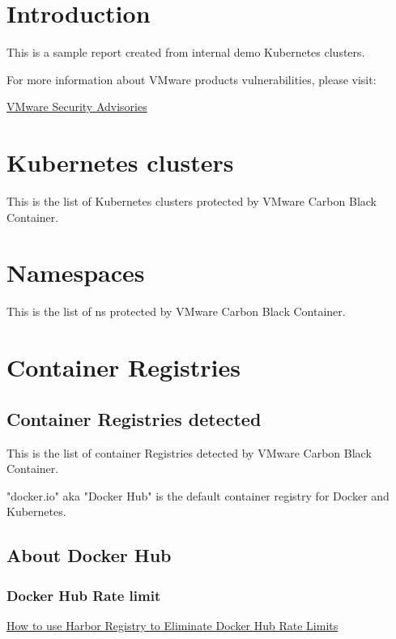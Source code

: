 \section{Introduction}

This is a sample report created from internal demo Kubernetes clusters.

\vskip15pt
\par

For more information about VMware products vulnerabilities, please visit:

\href{https://www.vmware.com/security/advisories.html}{VMware Security Advisories}


\section{Kubernetes clusters}

This is the list of Kubernetes clusters protected by VMware Carbon Black Container.
\vskip15pt


\section{Namespaces}

This is the list of \gls{ns} protected by VMware Carbon Black Container.
\vskip15pt


\section{Container Registries}
\subsection{Container Registries detected}
This is the list of container Registries detected by VMware Carbon Black Container.
\vskip15pt


\vskip15pt

"docker.io" aka "Docker Hub" is the default container registry for Docker and Kubernetes.

\subsection{About Docker Hub}
\subsubsection{Docker Hub Rate limit}
\href{https://tanzu.vmware.com/developer/guides/harbor-as-docker-proxy/}{How to use Harbor Registry to Eliminate Docker Hub Rate Limits}

